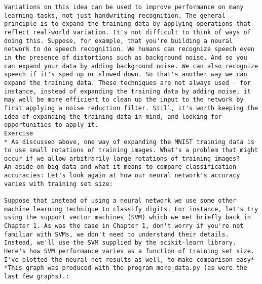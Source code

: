 \begin{lstlisting}
Variations on this idea can be used to improve performance on many learning tasks, not just handwriting recognition. The general principle is to expand the training data by applying operations that reflect real-world variation. It's not difficult to think of ways of doing this. Suppose, for example, that you're building a neural network to do speech recognition. We humans can recognize speech even in the presence of distortions such as background noise. And so you can expand your data by adding background noise. We can also recognize speech if it's sped up or slowed down. So that's another way we can expand the training data. These techniques are not always used - for instance, instead of expanding the training data by adding noise, it may well be more efficient to clean up the input to the network by first applying a noise reduction filter. Still, it's worth keeping the idea of expanding the training data in mind, and looking for opportunities to apply it.
Exercise
* As discussed above, one way of expanding the MNIST training data is to use small rotations of training images. What's a problem that might occur if we allow arbitrarily large rotations of training images? 
An aside on big data and what it means to compare classification accuracies: Let's look again at how our neural network's accuracy varies with training set size:

Suppose that instead of using a neural network we use some other machine learning technique to classify digits. For instance, let's try using the support vector machines (SVM) which we met briefly back in Chapter 1. As was the case in Chapter 1, don't worry if you're not familiar with SVMs, we don't need to understand their details. Instead, we'll use the SVM supplied by the scikit-learn library. Here's how SVM performance varies as a function of training set size. I've plotted the neural net results as well, to make comparison easy* *This graph was produced with the program more_data.py (as were the last few graphs).:


\end{lstlisting}
